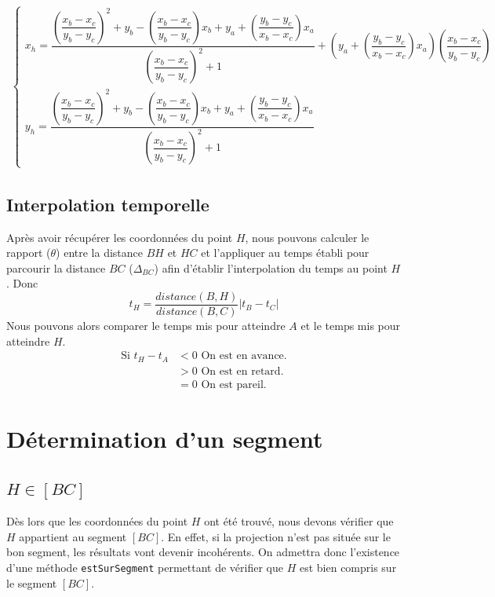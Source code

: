 \begin{align}
	\begin{cases}
		 x_h = \dfrac{\left( \dfrac{x_b - x_c}{y_b - y_c}\right)^2 + y_b - \left( \dfrac{x_b - x_c}{y_b - y_c}\right) x_b + y_a + \left( \dfrac{y_b - y_c}{x_b - x_c}\right) x_a}{\left( \dfrac{x_b - x_c}{y_b - y_c}\right)^2 + 1} + \left( y_a + \left( \dfrac{y_b - y_c}{x_b - x_c}\right) x_a\right) \left( \dfrac{x_b - x_c}{y_b - y_c}\right)  \\
    	 y_h = \dfrac{\left( \dfrac{x_b - x_c}{y_b - y_c}\right)^2 + y_b - \left( \dfrac{x_b - x_c}{y_b - y_c}\right) x_b + y_a + \left( \dfrac{y_b - y_c}{x_b - x_c}\right) x_a}{\left( \dfrac{x_b - x_c}{y_b - y_c}\right)^2 + 1}
	\end{cases}
\end{align}

\subsection{Interpolation temporelle}
Après avoir récupérer les coordonnées du point $H$, nous pouvons calculer le rapport ($\theta$) entre la distance $BH$ et $HC$ et l'appliquer au temps établi pour parcourir la distance $BC$ ($\Delta_{BC}$) afin d'établir l'interpolation du temps au point $H$. Donc
\[
	t_H = \frac{distance(B,H)}{distance(B,C)}| t_B - t_C | 
\]
Nous pouvons alors comparer le temps mis pour atteindre $A$ et le temps mis pour atteindre $H$.
\begin{align}
\mbox{Si } t_H - t_A &<0 \mbox{ On est en avance.} \\
			&>0 \mbox{ On est en retard.} \\
			&=0 \mbox{ On est pareil.}
\end{align}

\section{Détermination d'un segment}
\subsection{$H \in [BC]$}
Dès lors que les coordonnées du point $H$ ont été trouvé, nous devons vérifier que $H$ appartient au segment $[BC]$. En effet, si la projection n'est pas située sur le bon segment, les résultats vont devenir incohérents. On admettra donc l'existence d'une méthode \verb!estSurSegment! permettant de vérifier que $H$ est bien compris sur le segment $[BC]$.

